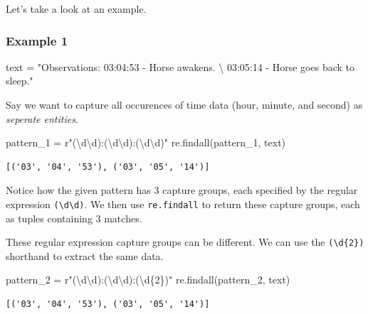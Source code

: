 \documentclass[
  letterpaper,
  DIV=11,
  numbers=noendperiod]{scrreprt}
\newenvironment{Shaded}{\begin{snugshade}}{\end{snugshade}}
\newcommand{\CharTok}[1]{\textcolor[rgb]{0.13,0.47,0.30}{#1}}
\newcommand{\NormalTok}[1]{\textcolor[rgb]{0.00,0.23,0.31}{#1}}
\newcommand{\OperatorTok}[1]{\textcolor[rgb]{0.37,0.37,0.37}{#1}}
\newcommand{\SpecialCharTok}[1]{\textcolor[rgb]{0.37,0.37,0.37}{#1}}
\newcommand{\StringTok}[1]{\textcolor[rgb]{0.13,0.47,0.30}{#1}}
\newcommand{\VerbatimStringTok}[1]{\textcolor[rgb]{0.13,0.47,0.30}{#1}}
\begin{document}
Let's take a look at an example.

\hypertarget{example-1}{%
\subsubsection{Example 1}\label{example-1}}

\begin{Shaded}
\begin{Highlighting}[]
\NormalTok{text }\OperatorTok{=} \StringTok{"Observations: 03:04:53 {-} Horse awakens. }\CharTok{\textbackslash{}}
\StringTok{        03:05:14 {-} Horse goes back to sleep."}
\end{Highlighting}
\end{Shaded}

Say we want to capture all occurences of time data (hour, minute, and
second) as \emph{seperate entities}.

\begin{Shaded}
\begin{Highlighting}[]
\NormalTok{pattern\_1 }\OperatorTok{=} \VerbatimStringTok{r"(\textbackslash{}d\textbackslash{}d):(\textbackslash{}d\textbackslash{}d):(\textbackslash{}d\textbackslash{}d)"}
\NormalTok{re.findall(pattern\_1, text)}
\end{Highlighting}
\end{Shaded}

\begin{verbatim}
[('03', '04', '53'), ('03', '05', '14')]
\end{verbatim}

Notice how the given pattern has 3 capture groups, each specified by the
regular expression \texttt{(\textbackslash{}d\textbackslash{}d)}. We
then use \texttt{re.findall} to return these capture groups, each as
tuples containing 3 matches.

These regular expression capture groups can be different. We can use the
\texttt{(\textbackslash{}d\{2\})} shorthand to extract the same data.

\begin{Shaded}
\begin{Highlighting}[]
\NormalTok{pattern\_2 }\OperatorTok{=} \VerbatimStringTok{r"(\textbackslash{}d\textbackslash{}d):(\textbackslash{}d\textbackslash{}d):(\textbackslash{}d}\SpecialCharTok{\{2\}}\VerbatimStringTok{)"}
\NormalTok{re.findall(pattern\_2, text)}
\end{Highlighting}
\end{Shaded}

\begin{verbatim}
[('03', '04', '53'), ('03', '05', '14')]
\end{verbatim}
\end{document}
